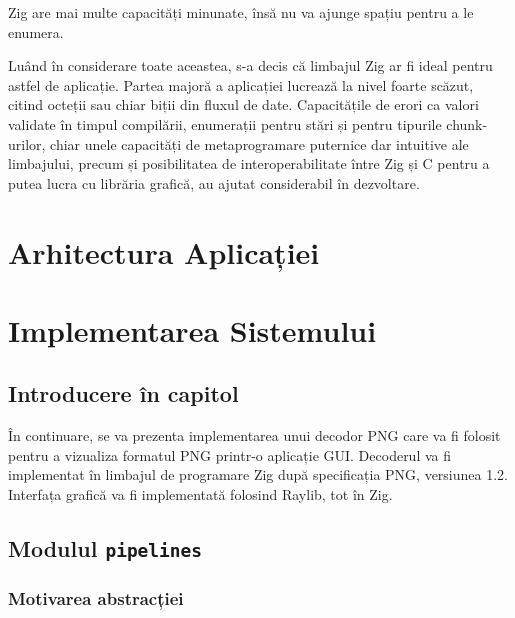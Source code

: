 \documentclass[a4paper,12pt]{report}
\begin{document}
Zig are mai multe capacități minunate, însă nu va ajunge spațiu pentru a le enumera.

Luând în considerare toate aceastea, s-a decis că limbajul Zig ar fi ideal pentru astfel de aplicație.
Partea majoră a aplicației lucrează la nivel foarte scăzut,
citind octeții sau chiar biții din fluxul de date.
Capacitățile de erori ca valori validate în timpul compilării,
enumerații pentru stări și pentru tipurile chunk-urilor,
chiar unele capacități de metaprogramare puternice dar intuitive ale limbajului,
precum și posibilitatea de interoperabilitate între Zig și C pentru a putea lucra cu librăria grafică,
au ajutat considerabil în dezvoltare.


\chapter{Arhitectura Aplicației}\label{architecture_chapter_title}



\chapter{Implementarea Sistemului}\label{implementation_chapter_title}

\section{Introducere în capitol}

În continuare, se va prezenta implementarea unui decodor \ac{PNG} care va fi folosit pentru
a vizualiza formatul \ac{PNG} printr-o aplicație \ac{GUI}.
Decoderul va fi implementat în limbajul de programare Zig\cite{zig}
după specificația \ac{PNG}, versiunea 1.2\cite{png_spec}.
Interfața grafică va fi implementată folosind Raylib\cite{raylib}, tot în Zig.

\section{Modulul \texttt{pipelines}}

\subsection{Motivarea abstracției}
\end{document}
